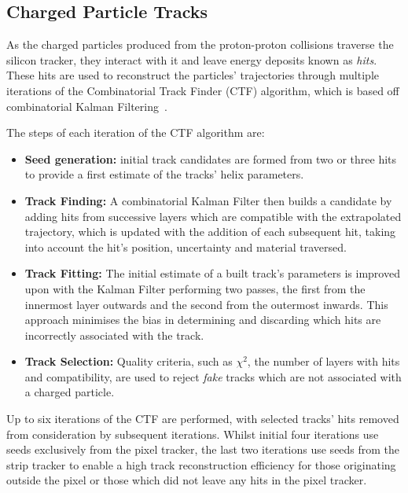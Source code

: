 \subsection{Charged Particle Tracks}\label{subsec:tracks}
As the charged particles produced from the proton-proton collisions traverse the silicon tracker, they interact with it and leave energy deposits known as \emph{hits}.
These hits are used to reconstruct the particles' trajectories through multiple iterations of the Combinatorial Track Finder (CTF) algorithm, which is based off combinatorial Kalman Filtering~\cite{Chatrchyan:2014fea,Fruhwirth:1987fm}.

The steps of each iteration	of the CTF algorithm are:
\begin{itemize}
\item \textbf{Seed generation:} initial track candidates are formed from two or three hits to provide a first estimate of the tracks' helix parameters.
\item \textbf{Track Finding:} A combinatorial Kalman Filter then builds a candidate by adding hits from successive layers which are compatible with the extrapolated trajectory, which is updated with the addition of each subsequent hit, taking into account the hit's position, uncertainty and material traversed.
\item \textbf{Track Fitting:} The initial estimate of a built track's parameters is improved upon with the Kalman Filter performing two passes, the first from the innermost layer outwards and the second from the outermost inwards.
This approach minimises the bias in determining and discarding which hits are incorrectly associated with the track.
\item \textbf{Track Selection:} Quality criteria, such as $\chi^{2}$, the number of layers with hits and compatibility, are used to reject \emph{fake} tracks which are not associated with a charged particle.
\end{itemize}

Up to six iterations of the CTF are performed, with selected tracks' hits removed from consideration by subsequent iterations.
Whilst initial four iterations use seeds exclusively from the pixel tracker, the last two iterations use seeds from the strip tracker to enable a high track reconstruction efficiency for those originating outside the pixel or those which did not leave any hits in the pixel tracker.

